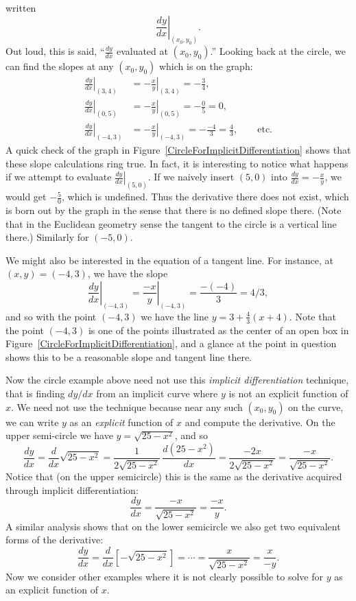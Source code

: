 written
$$\left.\frac{dy}{dx}\right|_{(x_0,y_0)}.$$
Out loud, this is said, ``$\frac{dy}{dx}$ evaluated at 
$\left(x_0,y_0\right)$.''
Looking back at the circle, we can find the slopes
at any $(x_0,y_0)$ which is on the graph:
\begin{align*}
\left.\frac{dy}{dx}\right|_{(3,4)}&=
\left.-\frac{x}y\right|_{(3,4)}=-\frac34,\\
\left.\frac{dy}{dx}\right|_{(0,5)}
&=\left.-\frac{x}{y}\right|_{(0,5)}=-\frac05=0,\\
\left.\frac{dy}{dx}\right|_{(-4,3)}
&=\left.-\frac{x}{y}\right|_{(-4,3)}=-\frac{-4}3=\frac43,
\qquad\text{etc.}\end{align*}
A quick check of the graph in Figure~\ref{CircleForImplicitDifferentiation}
shows that these slope calculations ring true.  In fact,
it is interesting to notice what happens if we attempt to evaluate
$\left.\frac{dy}{dx}\right|_{(5,0)}$. If we naively
insert $(5,0)$ into $\frac{dy}{dx}=-\frac{x}y$, we 
would get $-\frac50$, which is undefined.  Thus the
derivative there does not exist, which is born out
by the graph in the sense that there is no
defined slope there. (Note that in the Euclidean geometry sense the 
tangent to the circle is a vertical line there.)
Similarly for $(-5,0)$.

We might also be interested in the equation of a tangent line.
For instance, at $(x,y)=(-4,3)$, we have the slope
$$\left.\frac{dy}{dx}\right|_{(-4,3)}=\left.\frac{-x}{y}\right|_{(-4,3)}
  =\frac{-(-4)}{3}=4/3,$$
and so with the point $(-4,3)$ we have the line $y=3+\frac43(x+4)$.
Note that the point $(-4,3)$ is one of the points illustrated as
the center of an open box in Figure~\ref{CircleForImplicitDifferentiation},
and a glance at the point in question shows this to be a reasonable
slope and tangent line there.

Now the circle example above need not use this {\it implicit differentiation}
technique, that is finding $dy/dx$ from an implicit curve where $y$ is not
an explicit function of $x$.  We need not use the technique because
near any such $(x_0,y_0)$ on the curve, we can write $y$ as an 
{\it explicit} function of $x$ and compute the derivative.
On the upper semi-circle we have $y=\sqrt{25-x^2}$, and so
$$\frac{dy}{dx}=\frac{d}{dx}\sqrt{25-x^2}
   =\frac1{2\sqrt{25-x^2}}\,\frac{d\left(25-x^2\right)}{dx}
   =\frac{-2x}{2\sqrt{25-x^2}}=\frac{-x}{\sqrt{25-x^2}}.$$
Notice that (on the upper semicircle)
this is the same as the derivative acquired through implicit
differentiation:
$$\frac{dy}{dx}=\frac{-x}{\sqrt{25-x^2}}=\frac{-x}y.$$
A similar analysis shows that on the lower semicircle we also get
two equivalent forms of the derivative:
$$\frac{dy}{dx}=\frac{d}{dx}\left[-\sqrt{25-x^2}\right]=\cdots
    =\frac{x}{\sqrt{25-x^2}}
    =\frac{x}{-y}.$$
Now we consider other examples where it is not clearly possible
to solve for $y$ as an explicit function of $x$.

